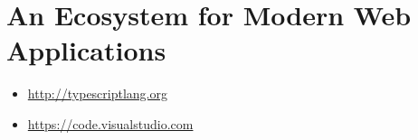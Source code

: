 \section{An Ecosystem for Modern Web Applications}




\begin{itemize}
  \item \url{http://typescriptlang.org}
\end{itemize}


\begin{itemize}
  \item \url{https://code.visualstudio.com}
\end{itemize}





